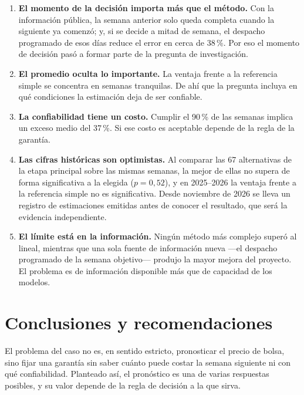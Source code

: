\documentclass[11pt,letterpaper]{article}
\begin{document}
\begin{enumerate}
  \item \textbf{El momento de la decisión importa más que el método.}
        Con la información pública, la semana anterior solo queda
        completa cuando la siguiente ya comenzó; y, si se decide a mitad
        de semana, el despacho programado de esos días reduce el error en
        cerca de 38\,\%. Por eso el momento de decisión pasó a formar
        parte de la pregunta de investigación.
  \item \textbf{El promedio oculta lo importante.} La ventaja frente a la
        referencia simple se concentra en semanas tranquilas. De ahí que
        la pregunta incluya en qué condiciones la estimación deja de ser
        confiable.
  \item \textbf{La confiabilidad tiene un costo.} Cumplir el 90\,\% de
        las semanas implica un exceso medio del 37\,\%. Si ese costo es
        aceptable depende de la regla de la garantía.
  \item \textbf{Las cifras históricas son optimistas.} Al comparar las
        67 alternativas de la etapa principal sobre las mismas semanas,
        la mejor de ellas no supera de forma significativa a la elegida
        ($p=0{,}52$), y en 2025--2026 la
        ventaja frente a la referencia simple no es significativa. Desde
        noviembre de 2026 se lleva un registro de estimaciones emitidas
        antes de conocer el resultado, que será la evidencia independiente.
  \item \textbf{El límite está en la información.} Ningún método más
        complejo superó al lineal, mientras que una sola fuente de
        información nueva ---el despacho programado de la semana
        objetivo--- produjo la mayor mejora del proyecto. El problema es
        de información disponible más que de capacidad de los modelos.
\end{enumerate}

\section{Conclusiones y recomendaciones}

El problema del caso no es, en sentido estricto, pronosticar el precio de
bolsa, sino fijar una garantía sin saber cuánto puede costar la semana
siguiente ni con qué confiabilidad. Planteado así, el pronóstico es una
de varias respuestas posibles, y su valor depende de la regla de
decisión a la que sirva.
\end{document}
